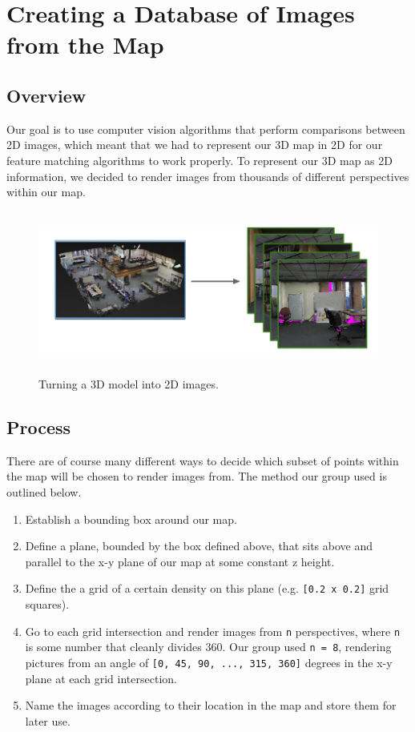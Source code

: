 \documentclass[a4paper,11pt]{article}
\begin{document}
   \section{Creating a Database of Images from the Map}
   \subsection{Overview}
  Our goal is to use computer vision algorithms that perform comparisons between 2D images, which meant that we had to represent our 3D map in 2D for our feature matching algorithms to work properly. To represent our 3D map as 2D information, we decided to render images from thousands of different perspectives within our map.

  \begin{figure}[h!]
   \centering
     \includegraphics[height=2.1in,width=5.3in,angle=0]{../Artifacts/RenderImages}
   \caption{Turning a 3D model into 2D images.}
  \end{figure}
 
 \subsection{Process}
  There are of course many different ways to decide which subset of points within the map will be chosen to render images from. The method our group used is outlined below.

  \begin{enumerate}
  \item Establish a bounding box around our map.
  \item Define a plane, bounded by the box defined above, that sits above and parallel to the x-y plane of our map at some constant z height.
  \item Define the a grid of a certain density on this plane (e.g. \texttt{[0.2 x 0.2]} grid squares).
  \item Go to each grid intersection and render images from \texttt{n} perspectives, where \texttt{n} is some number that cleanly divides 360. Our group used \texttt{n = 8}, rendering pictures from an angle of \texttt{[0, 45, 90, ..., 315, 360]} degrees in the x-y plane at each grid intersection.
  \item Name the images according to their location in the map and store them for later use.
  \end{enumerate} 
\end{document}

